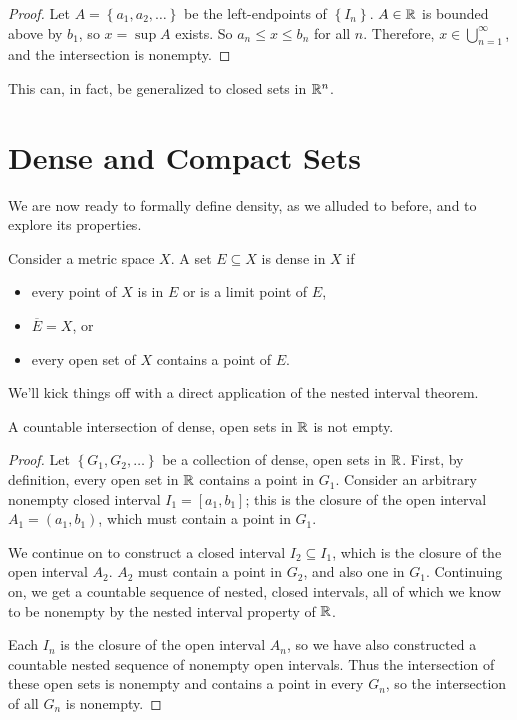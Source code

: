 \documentclass[../m131main.tex]{subfiles}
\begin{document}
\begin{proof}
    Let $A = \left\{ a_1, a_2, \ldots \right\}$ be the left-endpoints of $\left\{ I_n \right\}$.
    $A \in \mathbb{R}$ is bounded above by $b_1$, so $x = \sup A$ exists.
    So $a_n \leq x \leq b_n$ for all $n$.
    Therefore, $x \in \bigcup_{n=1}^\infty$, and the intersection is nonempty.
\end{proof}

This can, in fact, be generalized to closed sets in $\mathbb{R}^n$.

\section{Dense and Compact Sets}
We are now ready to formally define density, as we alluded to before, and to explore its properties.

\begin{definition}
    Consider a metric space $X$.
    A set $E \subseteq X$ is dense in $X$ if
    \begin{itemize}
        \item every point of $X$ is in $E$ or is a limit point of $E$,
        \item $\overline{E} = X$, or
        \item every open set of $X$ contains a point of $E$.
    \end{itemize}
\end{definition}

We'll kick things off with a direct application of the nested interval theorem.

\begin{lemma}[]
    A countable intersection of dense, open sets in $\mathbb{R}$ is not empty.
\end{lemma}

\begin{proof}
    Let $\left\{ G_1, G_2, \ldots \right\}$ be a collection of dense, open sets in $\mathbb{R}$.
    First, by definition, every open set in $\mathbb{R}$ contains a point in $G_1$.
    Consider an arbitrary nonempty closed interval $I_1= [a_1, b_1]$; this is the closure of the open interval $A_1 = (a_1, b_1)$, which must contain a point in $G_1$.

    We continue on to construct a closed interval $I_2 \subseteq I_1$, which is the closure of the open interval $A_2$.
    $A_2$ must contain a point in $G_2$, and also one in $G_1$.
    Continuing on, we get a countable sequence of nested, closed intervals, all of which we know to be nonempty by the nested interval property of $\mathbb{R}$.

    Each $I_n$ is the closure of the open interval $A_n$, so we have also constructed a countable nested sequence of nonempty open intervals.
    Thus the intersection of these open sets is nonempty and contains a point in every $G_n$, so the intersection of all $G_n$ is nonempty.
\end{proof}
\end{document}
